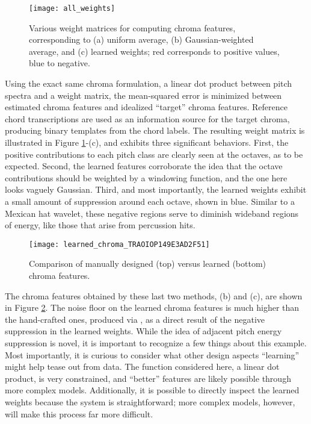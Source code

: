 \begin{figure}
\begin{centering}
\texttt{[image: all\_weights]}
\caption{Various weight matrices for computing chroma features, corresponding to (a) uniform average, (b) Gaussian-weighted average, and (c) learned weights; red corresponds to positive values, blue to negative.}
\label{fig:all_weights}
\end{centering}
\end{figure}

Using the exact same chroma formulation, a linear dot product between pitch spectra and a weight matrix, the mean-squared error is minimized between estimated chroma features and idealized ``target'' chroma features.
Reference chord transcriptions are used as an information source for the target chroma, producing binary templates from the chord labels.
The resulting weight matrix is illustrated in Figure \ref{fig:all_weights}-(c), and exhibits three significant behaviors.
First, the positive contributions to each pitch class are clearly seen at the octaves, as to be expected.
Second, the learned features corroborate the idea that the octave contributions should be weighted by a windowing function, and the one here looks vaguely Gaussian.
Third, and most importantly, the learned weights exhibit a small amount of suppression around each octave, shown in blue.
Similar to a Mexican hat wavelet, these negative regions serve to diminish wideband regions of energy, like those that arise from percussion hits.


\begin{figure}
\begin{centering}
\texttt{[image: learned\_chroma\_TRAOIOP149E3AD2F51]}
\caption{Comparison of manually designed (top) versus learned (bottom) chroma features.}
\label{fig:learned_chroma}
\end{centering}
\end{figure}

The chroma features obtained by these last two methods, (b) and (c), are shown in Figure \ref{fig:learned_chroma}.
The noise floor on the learned chroma features is much higher than the hand-crafted ones, produced via \cite{Cho2014}, as a direct result of the negative suppression in the learned weights.
While the idea of adjacent pitch energy suppression is novel, it is important to recognize a few things about this example.
Most importantly, it is curious to consider what other design aspects ``learning'' might help tease out from data.
The function considered here, a linear dot product, is very constrained, and ``better'' features are likely possible through more complex models.
Additionally, it is possible to directly inspect the learned weights because the system is straightforward; more complex models, however, will make this process far more difficult.



